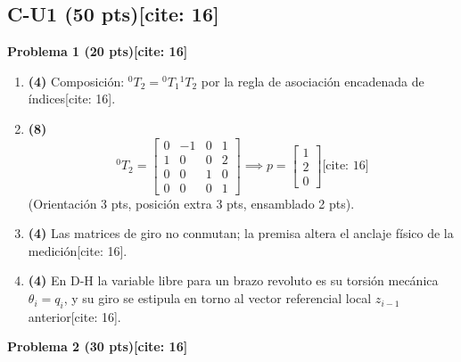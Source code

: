 \documentclass[11pt, a4paper]{article}
\begin{document}
\subsection*{C-U1 (50 pts)[cite: 16]}
\textbf{Problema 1 (20 pts)[cite: 16]}
\begin{enumerate}\footnotesize
    \item \textbf{(4)} Composición: ${}^0T_2 = {}^0T_1 {}^1T_2$ por la regla de asociación encadenada de índices[cite: 16].
    \item \textbf{(8)} \begin{equation*}
        {}^0T_2 = \begin{bmatrix} 0 & -1 & 0 & 1 \\ 1 & 0 & 0 & 2 \\ 0 & 0 & 1 & 0 \\ 0 & 0 & 0 & 1 \end{bmatrix} \implies p = \begin{bmatrix} 1 \\ 2 \\ 0 \end{bmatrix} \text{[cite: 16]}
    \end{equation*}
    (Orientación 3 pts, posición extra 3 pts, ensamblado 2 pts).
    \item \textbf{(4)} Las matrices de giro no conmutan; la premisa altera el anclaje físico de la medición[cite: 16].
    \item \textbf{(4)} En D-H la variable libre para un brazo revoluto es su torsión mecánica $\theta_i = q_i$, y su giro se estipula en torno al vector referencial local $z_{i-1}$ anterior[cite: 16].
\end{enumerate}
\textbf{Problema 2 (30 pts)[cite: 16]}
\end{document}
